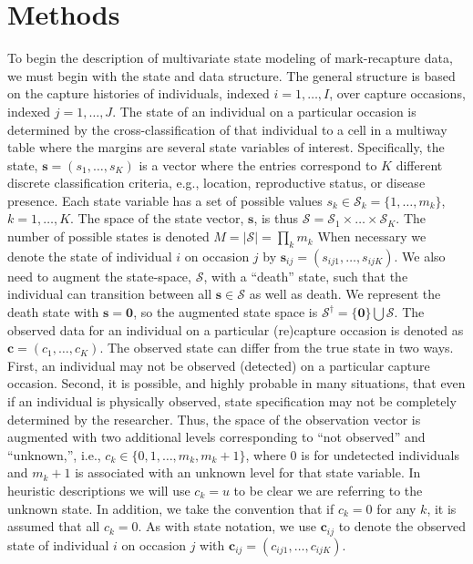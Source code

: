 \documentclass[sts]{imsart}
\numberwithin{equation}{section}
\theoremstyle{plain}
\newcommand{\bs}{\ensuremath{\mathbf{s}}}
\newcommand{\bc}{\ensuremath{\mathbf{c}}}
\newcommand{\fS}{\ensuremath{\mathcal{S}}}
\begin{document}
\section{Methods}

To begin the description of multivariate state modeling of mark-recapture data, we must begin with the state and data structure. The general structure is based on the capture histories of individuals, indexed $i=1,\dots,I$, over capture occasions, indexed $j=1,\dots,J$. The state of an individual on a particular occasion is determined by the cross-classification of that individual to a cell in a multiway table where the margins are several state variables of interest. Specifically, the state, $\bs = (s_1,\dots,s_K)$ is a vector where the entries correspond to $K$ different discrete classification criteria, e.g., location, reproductive status, or disease presence. Each state variable has a set of possible values $s_k \in \fS_k=\{1,\dots,m_k\}$, $k=1,\dots,K$. The space of the state vector, $\bs$, is thus $\fS = \fS_1 \times \dots \times \fS_K$. The number of possible states is denoted $M = |\fS|=\prod_k m_k$ When necessary we denote the state of individual $i$ on occasion $j$ by $\bs_{ij}=(s_{ij1},\dots,s_{ijK})$. We also need to augment the state-space, $\fS$, with a ``death'' state, such that the individual can transition between all $\bs\in\fS$ as well as death. We represent the death state with $\bs=\mathbf{0}$, so the augmented state space is $\fS^\dagger = \{\mathbf{0}\}\bigcup\fS$. The observed data for an individual on a particular (re)capture occasion is denoted as $\bc = (c_1,\dots,c_K)$. The observed state can differ from the true state in two ways. First, an individual may not be observed (detected) on a particular capture occasion. Second, it is possible, and highly probable in many situations, that even if an individual is physically observed, state specification may not be completely determined by the researcher. Thus, the space of the observation vector is augmented with two additional levels corresponding to ``not observed'' and ``unknown,'', i.e., $c_k \in \{0,1,\dots,m_k,m_k+1\}$, where 0 is for undetected individuals and $m_k+1$ is associated with an unknown level for that state variable. In heuristic descriptions we will use $c_k = u$ to be clear we are referring to the unknown state. In addition, we take the convention that if $c_k=0$ for any $k$, it is assumed that all $c_k=0$. As with state notation, we use $\bc_{ij}$ to denote the observed state of individual $i$ on occasion $j$ with $\bc_{ij}=(c_{ij1},\dots,c_{ijK})$.
\end{document}
